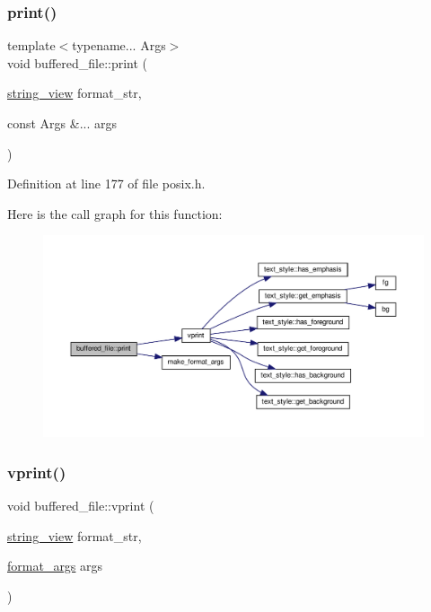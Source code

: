\subsubsection{\texorpdfstring{print()}{print()}}
{\footnotesize\ttfamily template$<$typename... Args$>$ \\
void buffered\+\_\+file\+::print (\begin{DoxyParamCaption}\item[{\hyperlink{core_8h_a17e3ff7f9ac2b8f068f719b829890036}{string\+\_\+view}}]{format\+\_\+str,  }\item[{const Args \&...}]{args }\end{DoxyParamCaption})\hspace{0.3cm}{\ttfamily [inline]}}



Definition at line 177 of file posix.\+h.

Here is the call graph for this function\+:
\nopagebreak
\begin{figure}[H]
\begin{center}
\leavevmode
\includegraphics[width=350pt]{classbuffered__file_ad97c4521f94be51a5b30064803e2bef1_cgraph}
\end{center}
\end{figure}
\mbox{\label{classbuffered__file_a0a34fceffc31cc126a6b731461c88d8d}} 
\subsubsection{\texorpdfstring{vprint()}{vprint()}}
{\footnotesize\ttfamily void buffered\+\_\+file\+::vprint (\begin{DoxyParamCaption}\item[{\hyperlink{core_8h_a17e3ff7f9ac2b8f068f719b829890036}{string\+\_\+view}}]{format\+\_\+str,  }\item[{\hyperlink{structformat__args}{format\+\_\+args}}]{args }\end{DoxyParamCaption})\hspace{0.3cm}{\ttfamily [inline]}}



